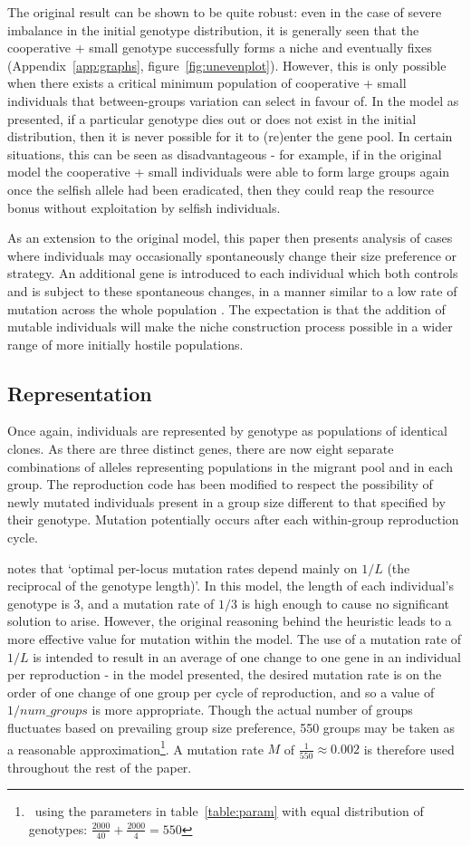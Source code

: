 \documentclass[11pt]{article}
\begin{document}
The original result can be shown to be quite robust: even in the case of severe imbalance in the initial genotype distribution, it is generally seen that the cooperative + small genotype successfully forms a niche and eventually fixes (Appendix~\ref{app:graphs}, figure~\ref{fig:unevenplot}). However, this is only possible when there exists a critical minimum population of cooperative + small individuals that between-groups variation can select in favour of. In the model as presented, if a particular genotype dies out or does not exist in the initial distribution, then it is never possible for it to (re)enter the gene pool. In certain situations, this can be seen as disadvantageous  - for example, if in the original model the cooperative + small individuals were able to form large groups again once the selfish allele had been eradicated, then they could reap the resource bonus without exploitation by selfish individuals.

As an extension to the original model, this paper then presents analysis of cases where individuals may occasionally spontaneously change their size preference or strategy. An additional gene is introduced to each individual which both controls and is subject to these spontaneous changes, in a manner similar to a low rate of mutation across the whole population \citep{adaption}. The expectation is that the addition of mutable individuals will make the niche construction process possible in a wider range of more initially hostile populations.
\subsection{Representation}
Once again, individuals are represented by genotype as populations of identical clones. As there are three distinct genes, there are now eight separate combinations of alleles representing populations in the migrant pool and in each group. The reproduction code has been modified to respect the possibility of newly mutated individuals present in a group size different to that specified by their genotype. Mutation potentially occurs after each within-group reproduction cycle.

\citet{optimal} notes that `optimal per-locus mutation rates depend mainly on $1/L$ (the reciprocal of the genotype length)'. In this model, the length of each individual's genotype is 3, and a mutation rate of $1/3$ is high enough to cause no significant solution to arise. %
However, the original reasoning behind the heuristic leads to a more effective value for mutation within the model. The use of a mutation rate of $1/L$ is intended to result in an average of one change to one gene in an individual per reproduction - in the model presented, the desired mutation rate is on the order of one change of one group per cycle of reproduction, and so a value of $1/num\_groups$ is more appropriate. Though the actual number of groups fluctuates based on prevailing group size preference, 550 groups may be taken as a reasonable approximation\footnote{~using the parameters in table~\ref{table:param} with equal distribution of genotypes: $\frac{2000}{40} + \frac{2000}{4} = 550$}. A mutation rate $M$ of $\frac{1}{550} \approx 0.002$ is therefore used throughout the rest of the paper.
\end{document}

